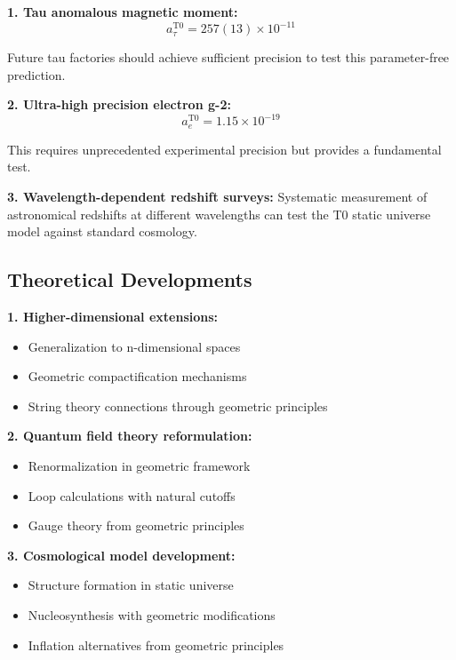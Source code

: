 \documentclass[12pt,a4paper]{report}
\begin{document}
\textbf{1. Tau anomalous magnetic moment:}
\begin{equation}
	a_\tau^{\text{T0}} = 257(13) \times 10^{-11}
\end{equation}

Future tau factories should achieve sufficient precision to test this parameter-free prediction.

\textbf{2. Ultra-high precision electron g-2:}
\begin{equation}
	a_e^{\text{T0}} = 1.15 \times 10^{-19}
\end{equation}

This requires unprecedented experimental precision but provides a fundamental test.

\textbf{3. Wavelength-dependent redshift surveys:}
Systematic measurement of astronomical redshifts at different wavelengths can test the T0 static universe model against standard cosmology.

\subsection{Theoretical Developments}
\label{subsec:theoretical_developments}

\textbf{1. Higher-dimensional extensions:}
\begin{itemize}
	\item Generalization to n-dimensional spaces
	\item Geometric compactification mechanisms
	\item String theory connections through geometric principles
\end{itemize}

\textbf{2. Quantum field theory reformulation:}
\begin{itemize}
	\item Renormalization in geometric framework
	\item Loop calculations with natural cutoffs
	\item Gauge theory from geometric principles
\end{itemize}

\textbf{3. Cosmological model development:}
\begin{itemize}
	\item Structure formation in static universe
	\item Nucleosynthesis with geometric modifications
	\item Inflation alternatives from geometric principles
\end{itemize}
\end{document}
